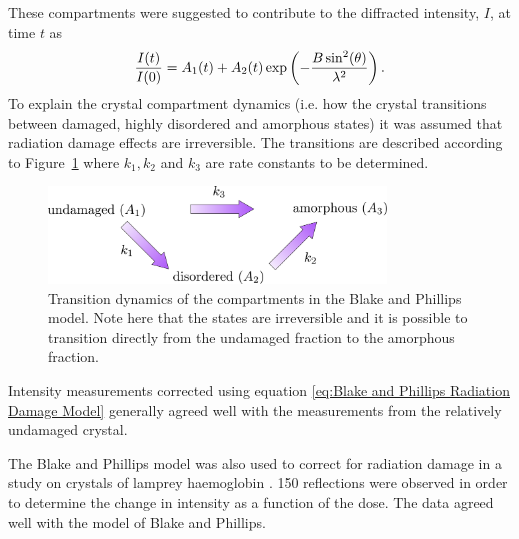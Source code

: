         These compartments were suggested to contribute to the diffracted intensity, $I$, at time $t$ as
        \begin{equation}
            \frac{I(t)}{I(0)} = A_1(t) + A_2(t) \exp\left(-\frac{B\sin^2(\theta)}{\lambda^2} \right).
            \label{eq:Blake and Phillips Radiation Damage Model}
        \end{equation}
        To explain the crystal compartment dynamics (i.e. how the crystal transitions between damaged, highly disordered and amorphous states) it was assumed that radiation damage effects are irreversible. The transitions are described according to Figure~\ref{fig:Crystal Compartments Blake and Phillips} where $k_1, k_2$ and $k_3$ are rate constants to be determined.
        \begin{figure}[H]
            \centering
            \includegraphics[width=0.8\textwidth]{figures/introduction/crystalcompartments_BP.pdf}
            \caption{Transition dynamics of the compartments in the Blake and Phillips model. Note here that the states are irreversible and it is possible to transition directly from the undamaged fraction to the amorphous fraction.}
            \label{fig:Crystal Compartments Blake and Phillips}
        \end{figure}
        Intensity measurements corrected using equation \ref{eq:Blake and Phillips Radiation Damage Model} generally agreed well with the measurements from the relatively undamaged crystal.

        The Blake and Phillips model was also used to correct for radiation damage in a study on crystals of lamprey haemoglobin \cite{hendrickson1973}.
        150 reflections were observed in order to determine the change in intensity as a function of the dose.
        The data agreed well with the model of Blake and Phillips.


